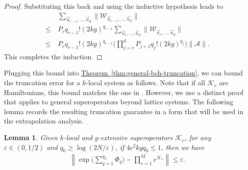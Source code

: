 \documentclass[aps,pra,reprint,groupedaddress,floatfix]{revtex4-2}
\newtheorem{lemma}{Lemma}
\newcommand{\thm}[1]{\hyperref[thm:#1]{Theorem~\ref*{thm:#1}}}
\newcommand{\eps}{\varepsilon}
\newcommand{\mc}{\mathcal}
\begin{document}
\begin{proof}
    Substituting this back and using the inductive hypothesis leads to
    \begin{align*}
        &\sum_{\vec{u}_{r-1}, \ldots, \vec{u}_d} \Big\|\mathcal{W}_{\vec{u}_{r-1}, \ldots, \vec{u}_d}\Big\| \\
        \le ~&P_r q_{r-1}! (2kg)^{q_{r-1}} \sum_{\vec{u}_{r}, \ldots, \vec{u}_d} \Big\|\mathcal{W}_{\vec{u}_{r}, \ldots, \vec{u}_d}\Big\| \\
        \le ~&P_r q_{r-1}! (2kg)^{q_{r-1}}  \bigg(\prod_{j=r}^{d}P_{j+1} q_j!(2kg)^{q_j}\bigg)\|\mc A\|.
    \end{align*}
    This completes the induction.
\end{proof}

Plugging this bound into \thm{general-bch-truncation}, we can bound the truncation error for a $k$-local system as follows. Note that if all $\mathcal{K}_v$ are Hamiltonians, this bound matches the one in \citet[Theorem 3]{mizuta2025commutator}. However, we use a distinct proof that applies to general superoperators beyond lattice systems. The following lemma records the resulting truncation guarantee in a form that will be used in the extrapolation analysis.
\begin{lemma}
\label{lem:bch-approx}
    Given $k$-local and $g$-extensive superoperators $\mc K_v$, for any $\eps\in (0,1/2)$ and  $q_0 \ge \log(2N/\eps)$, if $4e^2kgq_0\le 1$, then we have \begin{align*}
        \left\|\exp\Big(\sum_{q=1}^{q_0} \Phi_q\Big) - \prod_{v = 1}^Me^{\mc K_v} \right\|\le \eps.
    \end{align*}
\end{lemma}
\end{document}
